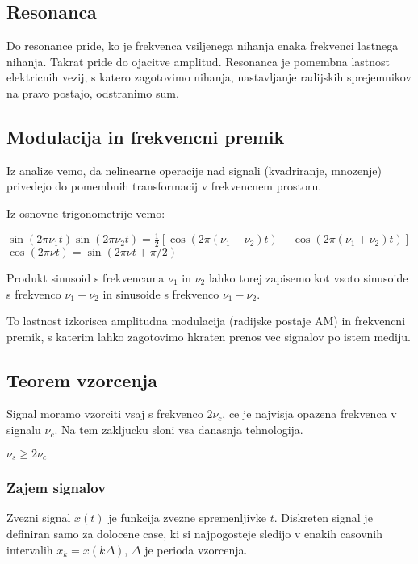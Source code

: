 \documentclass{article}
\begin{document}
\begin{multicols}{2}
	\subsection{Resonanca}
	Do resonance pride, ko je frekvenca vsiljenega nihanja enaka frekvenci lastnega nihanja. Takrat pride do ojacitve amplitud.
	Resonanca je pomembna lastnost elektricnih vezij, s katero zagotovimo nihanja, nastavljanje radijskih sprejemnikov na pravo postajo,
	odstranimo sum.

	\subsection{Modulacija in frekvencni premik}
	Iz analize vemo, da nelinearne operacije nad signali (kvadriranje, mnozenje) privedejo do
	pomembnih transformacij v frekvencnem prostoru.

	Iz osnovne trigonometrije vemo:
	\begin{center}
		\begin{math}
			\sin(2 \pi \nu_1 t) \sin(2 \pi \nu_2 t) = \frac{1}{2} [\cos(2 \pi(\nu_1 - \nu_2)t) - \cos(2 \pi (\nu_1 + \nu_2)t)]
		\end{math}\\
		\begin{math}
			\cos(2 \pi \nu t) = \sin(2 \pi \nu t + \pi / 2)
		\end{math}
	\end{center}
	Produkt sinusoid s frekvencama $\nu_1$ in $\nu_2$ lahko torej zapisemo kot vsoto sinusoide s frekvenco $\nu_1 + \nu_2$ in
	sinusoide s frekvenco $\nu_1 - \nu_2$.

	To lastnost izkorisca amplitudna modulacija (radijske postaje AM) in frekvencni premik, s katerim lahko zagotovimo
	hkraten prenos vec signalov po istem mediju.

	\subsection{Teorem vzorcenja}
	Signal moramo vzorciti vsaj s frekvenco $2 \nu_c$, ce je najvisja opazena frekvenca v signalu $\nu_c$. Na tem zakljucku
	sloni vsa danasnja tehnologija.
	\begin{center}
		$\nu_s \geq 2 \nu_c$
	\end{center}

	\subsubsection{Zajem signalov}
	Zvezni signal $x(t)$ je funkcija zvezne spremenljivke $t$. Diskreten signal je definiran samo za dolocene case, ki
	si najpogosteje sledijo v enakih casovnih intervalih $x_k = x(k \Delta)$, $\Delta$ je perioda vzorcenja.


\end{multicols}
\end{document}
